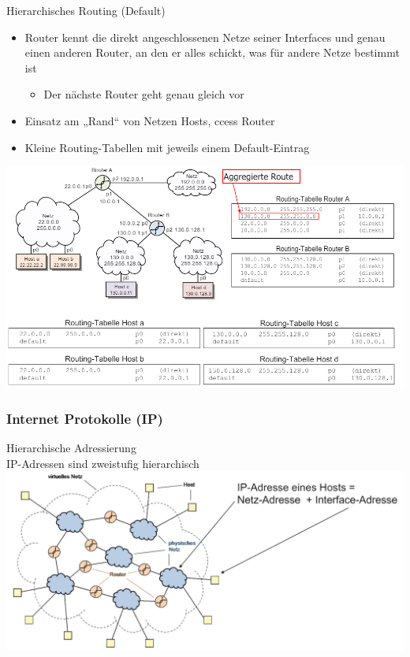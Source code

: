 \begin{concept}{Hierarchisches Routing (Default)}
    \begin{itemize}
        \item Router kennt die direkt angeschlossenen Netze seiner Interfaces und genau einen anderen Router, an den er alles schickt, was für andere Netze bestimmt ist
        \begin{itemize}
            \item Der nächste Router geht genau gleich vor
        \end{itemize}
        \item Einsatz am „Rand“ von Netzen Hosts, ccess Router
        \item Kleine Routing-Tabellen mit jeweils einem Default-Eintrag
    \end{itemize}
        \includegraphics[width=1\linewidth]{images/hierarchisches_routing.png}
\end{concept}

\subsubsection{Internet Protokolle (IP)}

\begin{definition}{Hierarchische Adressierung}\\
IP-Adressen sind zweistufig hierarchisch\\
    \includegraphics[width=1\linewidth]{images/hierarchische_ip_adressierung.png} 
\end{definition}

